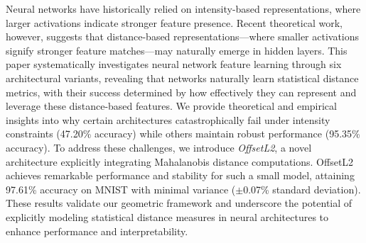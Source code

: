 Neural networks have historically relied on intensity-based representations, where larger activations indicate stronger feature presence. Recent theoretical work, however, suggests that distance-based representations—where smaller activations signify stronger feature matches—may naturally emerge in hidden layers. This paper systematically investigates neural network feature learning through six architectural variants, revealing that networks naturally learn statistical distance metrics, with their success determined by how effectively they can represent and leverage these distance-based features. We provide theoretical and empirical insights into why certain architectures catastrophically fail under intensity constraints (47.20\% accuracy) while others maintain robust performance (95.35\% accuracy). To address these challenges, we introduce \textit{OffsetL2}, a novel architecture explicitly integrating Mahalanobis distance computations. OffsetL2 achieves remarkable performance and stability for such a small model, attaining 97.61\% accuracy on MNIST with minimal variance ($\pm$0.07\% standard deviation). These results validate our geometric framework and underscore the potential of explicitly modeling statistical distance measures in neural architectures to enhance performance and interpretability.
